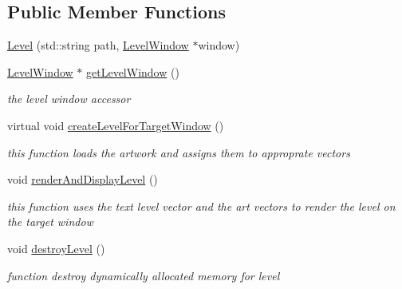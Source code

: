 \subsection*{Public Member Functions}
\begin{DoxyCompactItemize}
\item 
\hyperlink{class_level_aba4f031f3752773a8a04bf58997776b9}{Level} (std\+::string path, \hyperlink{class_level_window}{Level\+Window} $\ast$window)
\item 
\hypertarget{class_level_ab0ed136431f5f1b92ec834d5c90c3ba9}{}\label{class_level_ab0ed136431f5f1b92ec834d5c90c3ba9} 
\hyperlink{class_level_window}{Level\+Window} $\ast$ \hyperlink{class_level_ab0ed136431f5f1b92ec834d5c90c3ba9}{get\+Level\+Window} ()
\begin{DoxyCompactList}\small\item\em the level window accessor \end{DoxyCompactList}\item 
\hypertarget{class_level_abe1e2e7c89fef892c4620d1a41e5ac22}{}\label{class_level_abe1e2e7c89fef892c4620d1a41e5ac22} 
virtual void \hyperlink{class_level_abe1e2e7c89fef892c4620d1a41e5ac22}{create\+Level\+For\+Target\+Window} ()
\begin{DoxyCompactList}\small\item\em this function loads the artwork and assigns them to approprate vectors \end{DoxyCompactList}\item 
\hypertarget{class_level_a994a0ef12d416e1e808c99cf9aea277f}{}\label{class_level_a994a0ef12d416e1e808c99cf9aea277f} 
void \hyperlink{class_level_a994a0ef12d416e1e808c99cf9aea277f}{render\+And\+Display\+Level} ()
\begin{DoxyCompactList}\small\item\em this function uses the text level vector and the art vectors to render the level on the target window \end{DoxyCompactList}\item 
\hypertarget{class_level_a0ea9e8fdd3f01f14199ec70f2213f558}{}\label{class_level_a0ea9e8fdd3f01f14199ec70f2213f558} 
void \hyperlink{class_level_a0ea9e8fdd3f01f14199ec70f2213f558}{destroy\+Level} ()
\begin{DoxyCompactList}\small\item\em function destroy dynamically allocated memory for level \end{DoxyCompactList}\item 
\hypertarget{class_level_a040994ac065280b1d52524bbcba2bbaa}{}\label{class_level_a040994ac065280b1d52524bbcba2bbaa} 

\end{DoxyCompactItemize}
